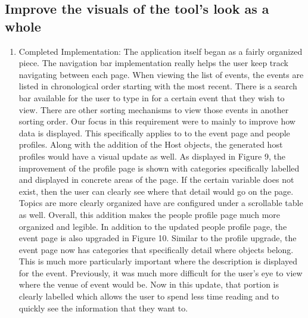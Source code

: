 \documentclass[draftclsnofoot,10pt,onecolumn]{IEEEtran} %
\begin{document}
\subsection{Improve the visuals of the tool's look as a whole}
\begin{enumerate}
  \item Completed Implementation: The application itself began as a fairly organized
  	piece. The navigation bar implementation really helps the user keep track navigating
  	between each page. When viewing the list of events, the events are listed in
  	chronological order starting with the most recent. There is a search bar
  	available for the user to type in for a certain event that they wish to view. There
  	are other sorting mechanisms to view those events in another sorting order.
  	Our focus in this requirement were to mainly to improve how data is displayed. This
  	specifically applies to to the event page and people profiles. Along with the addition
  	of the Host objects, the generated host profiles would have a visual update as well.
  	As displayed in Figure 9, the improvement of the profile page is shown with categories
  	specifically labelled and displayed in concrete areas of the page. If the certain variable
  	does not exist, then the user can clearly see where that detail would go on the page.
  	Topics are more clearly organized have are configured under a scrollable table as well.
  	Overall, this addition makes the people profile page much more organized and legible.
  	In addition to the updated people profile page, the event page is also upgraded in Figure
  	10. Similar to the profile upgrade, the event page now has categories that specifically
  	detail where objects belong. This is much more particularly important where the description
  	is displayed for the event. Previously, it was much more difficult for the user's eye to
  	view where the venue of event would be. Now in this update, that portion is clearly labelled
  	which allows the user to spend less time reading and to quickly see the information
  	that they want to. \\

\end{enumerate}
\fi

\iffalse
\end{document}
